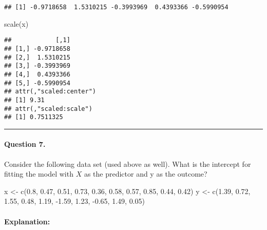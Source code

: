 \documentclass[
]{article}
\newenvironment{Shaded}{\begin{snugshade}}{\end{snugshade}}
\newcommand{\FloatTok}[1]{\textcolor[rgb]{0.00,0.00,0.81}{#1}}
\newcommand{\FunctionTok}[1]{\textcolor[rgb]{0.00,0.00,0.00}{#1}}
\newcommand{\NormalTok}[1]{#1}
\newcommand{\OtherTok}[1]{\textcolor[rgb]{0.56,0.35,0.01}{#1}}
\newcommand{\SpecialCharTok}[1]{\textcolor[rgb]{0.00,0.00,0.00}{#1}}
\begin{document}
\begin{verbatim}
## [1] -0.9718658  1.5310215 -0.3993969  0.4393366 -0.5990954
\end{verbatim}

\begin{Shaded}
\begin{Highlighting}[]
\FunctionTok{scale}\NormalTok{(x)}
\end{Highlighting}
\end{Shaded}

\begin{verbatim}
##            [,1]
## [1,] -0.9718658
## [2,]  1.5310215
## [3,] -0.3993969
## [4,]  0.4393366
## [5,] -0.5990954
## attr(,"scaled:center")
## [1] 9.31
## attr(,"scaled:scale")
## [1] 0.7511325
\end{verbatim}

\begin{center}\rule{0.5\linewidth}{0.5pt}\end{center}

\hypertarget{question-7.}{%
\paragraph{Question 7.}\label{question-7.}}

Consider the following data set (used above as well). What is the
intercept for fitting the model with \(X\) as the predictor and y as the
outcome?

\begin{Shaded}
\begin{Highlighting}[]
\NormalTok{x }\OtherTok{\textless{}{-}} \FunctionTok{c}\NormalTok{(}\FloatTok{0.8}\NormalTok{, }\FloatTok{0.47}\NormalTok{, }\FloatTok{0.51}\NormalTok{, }\FloatTok{0.73}\NormalTok{, }\FloatTok{0.36}\NormalTok{, }\FloatTok{0.58}\NormalTok{, }\FloatTok{0.57}\NormalTok{, }\FloatTok{0.85}\NormalTok{, }\FloatTok{0.44}\NormalTok{, }\FloatTok{0.42}\NormalTok{)}
\NormalTok{y }\OtherTok{\textless{}{-}} \FunctionTok{c}\NormalTok{(}\FloatTok{1.39}\NormalTok{, }\FloatTok{0.72}\NormalTok{, }\FloatTok{1.55}\NormalTok{, }\FloatTok{0.48}\NormalTok{, }\FloatTok{1.19}\NormalTok{, }\SpecialCharTok{{-}}\FloatTok{1.59}\NormalTok{, }\FloatTok{1.23}\NormalTok{, }\SpecialCharTok{{-}}\FloatTok{0.65}\NormalTok{, }\FloatTok{1.49}\NormalTok{, }\FloatTok{0.05}\NormalTok{)}
\end{Highlighting}
\end{Shaded}

\hypertarget{explanation-6}{%
\paragraph{Explanation:}\label{explanation-6}}
\end{document}
